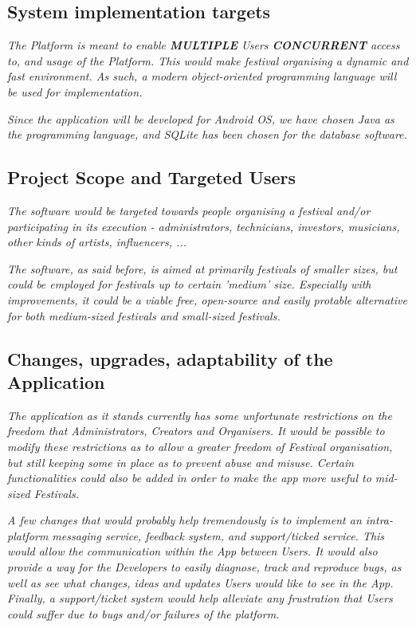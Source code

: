 	\subsection{System implementation targets}
	
	\textit{The Platform is meant to enable \textbf{MULTIPLE} Users \textbf{CONCURRENT} access to, and usage of the Platform. This would make festival organising a dynamic and fast environment. As such, a modern object-oriented programming language will be used for implementation.}
	
	\textit{Since the application will be developed for Android OS, we have chosen Java as the programming language, and SQLite has been chosen for the database software.}
	
	\subsection{Project Scope and Targeted Users}
	\textit{The software would be targeted towards people organising a festival and/or participating in its execution - administrators, technicians, investors, musicians, other kinds of artists, influencers, ...}
	
	\textit{The software, as said before, is aimed at primarily festivals of smaller sizes, but could be employed for festivals up to certain 'medium' size. Especially with improvements, it could be a viable free, open-source and easily protable alternative for both medium-sized festivals and small-sized festivals.}
	
	\subsection{Changes, upgrades, adaptability of the Application}
	\textit{The application as it stands currently has some unfortunate restrictions on the freedom that Administrators, Creators and Organisers. It would be possible to modify these restrictions as to allow a greater freedom of Festival organisation, but still keeping some in place as to prevent abuse and misuse. Certain functionalities could also be added in order to make the app more useful to mid-sized Festivals.}
	
	\textit{A few changes that would probably help tremendously is to implement an intra-platform messaging service, feedback system, and support/ticked service. This would allow the communication within the App between Users. It would also provide a way for the Developers to easily diagnose, track and reproduce bugs, as well as see what changes, ideas and updates Users would like to see in the App. Finally, a support/ticket system would help alleviate any frustration that Users could suffer due to bugs and/or failures of the platform.}
	
